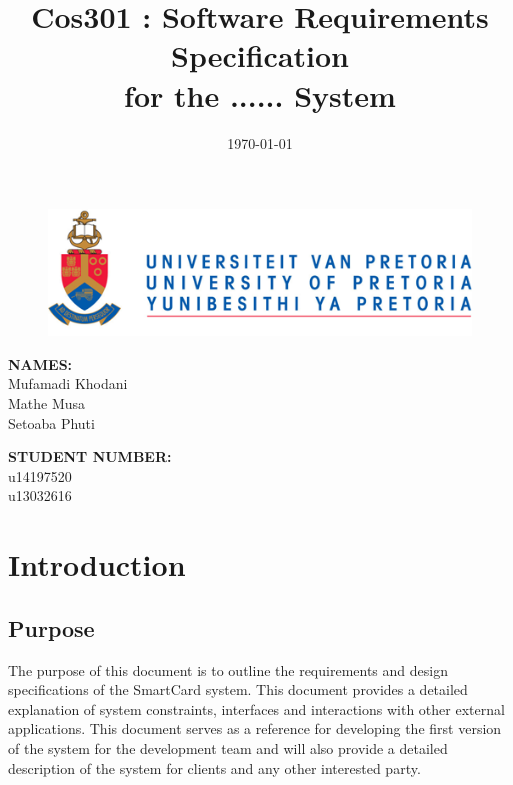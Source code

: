 \documentclass[english]{article}
\title{Cos301 : Software Requirements Specification\\
	for the ...... System\\
	}
\date{\today}
\begin{document}
	\maketitle
	\begin{figure}[!t]
		\includegraphics{up_logo.png}
	\end{figure}
	\begin{minipage}{0.4\textwidth}
		\begin{flushleft} \large
			\textbf{NAMES:}\\[0.4cm]
			Mufamadi {Khodani} \\
			Mathe {Musa} \\
			Setoaba {Phuti} \\ 
		\end{flushleft}
	\end{minipage}
	\begin{minipage}{0.4\textwidth}
		\begin{flushright} \large
			\textbf{STUDENT NUMBER:} \\[0.4cm]
			u14197520 \\
			u13032616 \\
		\end{flushright}
	\end{minipage}


	
	\newpage

	\tableofcontents
	\newpage

	

	\section{Introduction}
			

		\subsection{Purpose}
			The purpose of this document is to outline the requirements and design specifications of the SmartCard system. This document provides a detailed explanation of system constraints, interfaces and interactions with other external applications. This document serves as a reference for developing the first version of the system for the development team and will also provide a detailed description of the system for clients and any other interested party.
\end{document}
